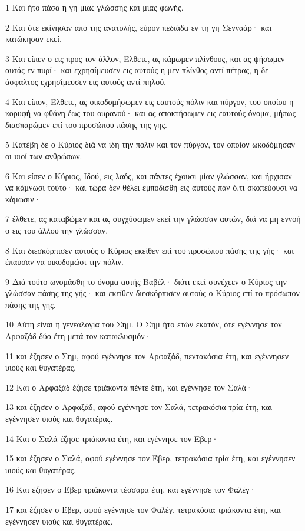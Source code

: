 \par 1 Και ήτο πάσα η γη μιας γλώσσης και μιας φωνής.
\par 2 Και ότε εκίνησαν από της ανατολής, εύρον πεδιάδα εν τη γη Σενναάρ· και κατώκησαν εκεί.
\par 3 Και είπεν ο εις προς τον άλλον, Έλθετε, ας κάμωμεν πλίνθους, και ας ψήσωμεν αυτάς εν πυρί· και εχρησίμευσεν εις αυτούς η μεν πλίνθος αντί πέτρας, η δε άσφαλτος εχρησίμευσεν εις αυτούς αντί πηλού.
\par 4 Και είπον, Έλθετε, ας οικοδομήσωμεν εις εαυτούς πόλιν και πύργον, του οποίου η κορυφή να φθάνη έως του ουρανού· και ας αποκτήσωμεν εις εαυτούς όνομα, μήπως διασπαρώμεν επί του προσώπου πάσης της γης.
\par 5 Κατέβη δε ο Κύριος διά να ίδη την πόλιν και τον πύργον, τον οποίον ωκοδόμησαν οι υιοί των ανθρώπων.
\par 6 Και είπεν ο Κύριος, Ιδού, εις λαός, και πάντες έχουσι μίαν γλώσσαν, και ήρχισαν να κάμνωσι τούτο· και τώρα δεν θέλει εμποδισθή εις αυτούς παν ό,τι σκοπεύουσι να κάμωσιν·
\par 7 έλθετε, ας καταβώμεν και ας συγχύσωμεν εκεί την γλώσσαν αυτών, διά να μη εννοή ο εις του άλλου την γλώσσαν.
\par 8 Και διεσκόρπισεν αυτούς ο Κύριος εκείθεν επί του προσώπου πάσης της γής· και έπαυσαν να οικοδομώσι την πόλιν.
\par 9 Διά τούτο ωνομάσθη το όνομα αυτής Βαβέλ· διότι εκεί συνέχεεν ο Κύριος την γλώσσαν πάσης της γής· και εκείθεν διεσκόρπισεν αυτούς ο Κύριος επί το πρόσωπον πάσης της γης.
\par 10 Αύτη είναι η γενεαλογία του Σημ. Ο Σημ ήτο ετών εκατόν, ότε εγέννησε τον Αρφαξάδ δύο έτη μετά τον κατακλυσμόν·
\par 11 και έζησεν ο Σημ, αφού εγέννησε τον Αρφαξάδ, πεντακόσια έτη, και εγέννησεν υιούς και θυγατέρας.
\par 12 Και ο Αρφαξάδ έζησε τριάκοντα πέντε έτη, και εγέννησε τον Σαλά·
\par 13 και έζησεν ο Αρφαξάδ, αφού εγέννησε τον Σαλά, τετρακόσια τρία έτη, και εγέννησεν υιούς και θυγατέρας.
\par 14 Και ο Σαλά έζησε τριάκοντα έτη, και εγέννησε τον Εβερ·
\par 15 και έζησεν ο Σαλά, αφού εγέννησε τον Έβερ, τετρακόσια τρία έτη, και εγέννησεν υιούς και θυγατέρας.
\par 16 Και έζησεν ο Έβερ τριάκοντα τέσσαρα έτη, και εγέννησε τον Φαλέγ·
\par 17 και έζησεν ο Έβερ, αφού εγέννησε τον Φαλέγ, τετρακόσια τριάκοντα έτη, και εγέννησεν υιούς και θυγατέρας.
